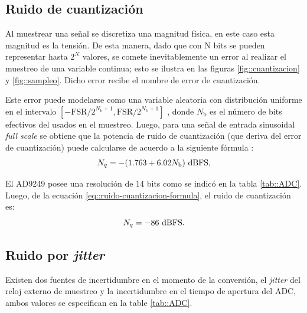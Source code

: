 \documentclass[../../main.tex]{subfiles}
\begin{document}

\subsection{Ruido de cuantización}
Al muestrear una señal se discretiza una magnitud física, en este caso esta magnitud es la tensión. De esta manera, dado que con N bits se pueden representar hasta $2^N$ valores, se comete inevitablemente un error al realizar el muestreo de una variable continua; esto se ilustra en las figuras \ref{fig::cuantizacion} y \ref{fig::sampleo}. Dicho error recibe el nombre de error de cuantización.

Este error puede modelarse como una variable aleatoria con distribución uniforme en el intervalo $[-\textrm{FSR}/{2^{N_\textrm{b} + 1}}, \textrm{FSR}/{2^{N_\textrm{b} + 1}}]$ \cite{formula-cuantizacion}, donde $N_\textrm{b}$ es el número de bits efectivos del usados en el muestreo. Luego, para una señal de entrada sinusoidal \textit{full scale} se obtiene que la potencia de ruido de cuantización (que deriva del error de cuantización) puede calcularse de acuerdo a la siguiente fórmula \cite{formula-cuantizacion}:
\begin{equation}
    N_q = - (1.763 + 6.02 N_\textrm{b})~\textrm{dBFS},
    \label{eq::ruido-cuantizacion-formula}
\end{equation}

El AD9249 posee una resolución de 14 bits como se indicó en la tabla \ref{tab::ADC}. Luego, de la ecuación \ref{eq::ruido-cuantizacion-formula}, el ruido de cuantización es:
\begin{equation}
    N_q = -86~\textrm{dBFS}.
    \label{eq::ruido-cuantizacion}
\end{equation}



\subsection{Ruido por \textit{jitter}}
Existen dos fuentes de incertidumbre en el momento de la conversión, el \textit{jitter} del reloj externo de muestreo y la incertidumbre en el tiempo de apertura del ADC, ambos valores se especifican en la table \ref{tab::ADC}.
\end{document}
